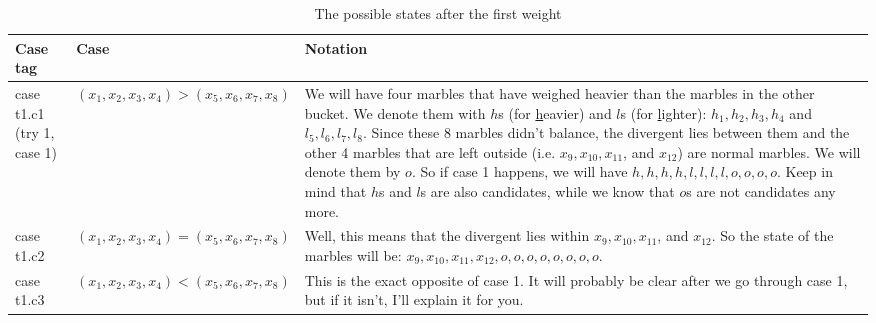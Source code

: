 \documentclass{article}
\begin{document}
\begin{table} %
	\caption{The possible states after the first weight}
	\label{tbl:try_1}
\begin{tabular}{|p{3cm}|p{5cm}|p{7cm}|}
	\hline
	Case tag& Case& Notation\\
	\hline
	\hline
	case t1.c1 (try 1, case 1)& $(x_1, x_2, x_3, x_4)>(x_5, x_6, x_7, x_8)$& We will have four marbles that have weighed heavier than the marbles in the other bucket. We denote them with $h$s (for \underline{h}eavier) and $l$s (for \underline{l}ighter): $h_1, h_2, h_3, h_4$ and $l_5, l_6, l_7, l_8$. Since these 8 marbles didn't balance, the divergent lies between them and the other 4 marbles that are left outside (i.e. $x_9, x_{10}, x_{11}$, and $x_{12}$) are normal marbles. We will denote them by $o$. So if case 1 happens, we will have $h, h, h, h, l, l, l, l, o, o, o, o$. Keep in mind that $h$s and $l$s are also candidates, while we know that $o$s are not candidates any more.\\
	\hline
	case t1.c2& $(x_1, x_2, x_3, x_4)=(x_5, x_6, x_7, x_8)$& Well, this means that the divergent lies within $x_9, x_{10}, x_{11}$, and $x_{12}$. So the state of the marbles will be: $x_9, x_{10}, x_{11}, x_{12}, o, o, o, o, o, o, o, o$.\\
	\hline
	case t1.c3& $(x_1, x_2, x_3, x_4)<(x_5, x_6, x_7, x_8)$& This is the exact opposite of case 1. It will probably be clear after we go through case 1, but if it isn't, I'll explain it for you.\\
	\hline
\end{tabular}
\end{table} %
\end{document}
